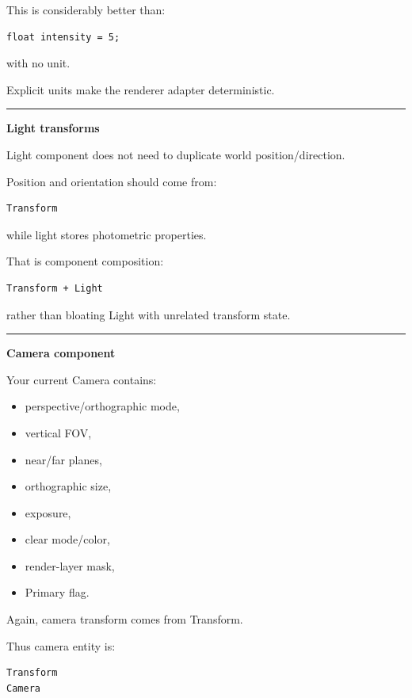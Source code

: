 This is considerably better than:

\begin{verbatim}
float intensity = 5;
\end{verbatim}

with no unit.

Explicit units make the renderer adapter deterministic.

\begin{center}\rule{0.5\linewidth}{0.5pt}\end{center}

\textbf{Light transforms}

Light component does not need to duplicate world position/direction.

Position and orientation should come from:

\begin{verbatim}
Transform
\end{verbatim}

while light stores photometric properties.

That is component composition:

\begin{verbatim}
Transform + Light
\end{verbatim}

rather than bloating Light with unrelated transform state.

\begin{center}\rule{0.5\linewidth}{0.5pt}\end{center}

\textbf{Camera component}

Your current Camera contains:

\begin{itemize}
\tightlist
\item
  perspective/orthographic mode,
\item
  vertical FOV,
\item
  near/far planes,
\item
  orthographic size,
\item
  exposure,
\item
  clear mode/color,
\item
  render-layer mask,
\item
  Primary flag.
\end{itemize}

Again, camera transform comes from Transform.

Thus camera entity is:

\begin{verbatim}
Transform
Camera
\end{verbatim}

